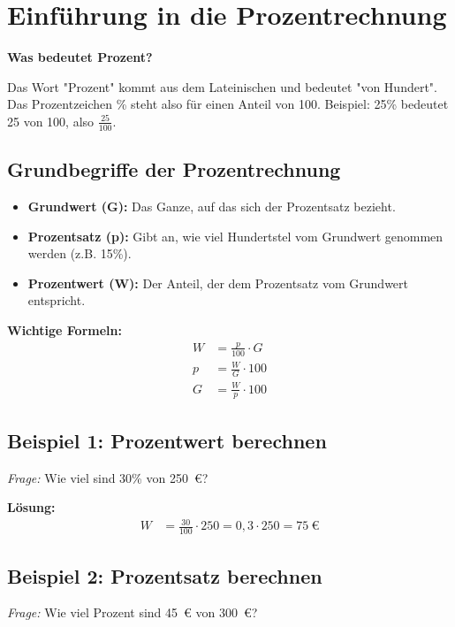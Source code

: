 

\section*{Einführung in die Prozentrechnung}

\textbf{Was bedeutet Prozent?}

Das Wort "Prozent" kommt aus dem Lateinischen und bedeutet "von Hundert". Das Prozentzeichen \% steht also für einen Anteil von 100. Beispiel: 25\% bedeutet 25 von 100, also $\frac{25}{100}$.

\subsection*{Grundbegriffe der Prozentrechnung}
\begin{itemize}
    \item \textbf{Grundwert (G):} Das Ganze, auf das sich der Prozentsatz bezieht.
    \item \textbf{Prozentsatz (p):} Gibt an, wie viel Hundertstel vom Grundwert genommen werden (z.B. 15\%).
    \item \textbf{Prozentwert (W):} Der Anteil, der dem Prozentsatz vom Grundwert entspricht.
\end{itemize}

\textbf{Wichtige Formeln:}
\begin{align*}
    W &= \frac{p}{100} \cdot G \\
    p &= \frac{W}{G} \cdot 100 \\
    G &= \frac{W}{p} \cdot 100
\end{align*}


\subsection*{Beispiel 1: Prozentwert berechnen}
\textit{Frage:} Wie viel sind 30\% von 250~\euro?

\textbf{Lösung:}
\begin{align*}
    W &= \frac{30}{100} \cdot 250 = 0{,}3 \cdot 250 = 75~\euro
\end{align*}

\subsection*{Beispiel 2: Prozentsatz berechnen}
\textit{Frage:} Wie viel Prozent sind 45~\euro{} von 300~\euro{}?

